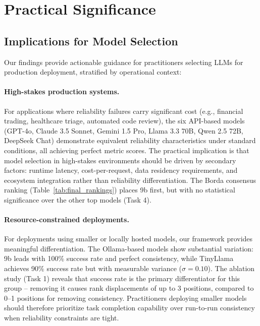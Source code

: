 \section{Practical Significance}

\subsection{Implications for Model Selection}

Our findings provide actionable guidance for practitioners selecting LLMs for production deployment, stratified by operational context:

\paragraph{High-stakes production systems.} For applications where reliability failures carry significant cost (e.g., financial trading, healthcare triage, automated code review), the six API-based models (GPT-4o, Claude 3.5 Sonnet, Gemini 1.5 Pro, Llama 3.3 70B, Qwen 2.5 72B, DeepSeek Chat) demonstrate equivalent reliability characteristics under standard conditions, all achieving perfect metric scores. The practical implication is that model selection in high-stakes environments should be driven by secondary factors: runtime latency, cost-per-request, data residency requirements, and ecosystem integration rather than reliability differentiation. The Borda consensus ranking (Table~\ref{tab:final_rankings}) places 9b first, but with no statistical significance over the other top models (Task 4).

\paragraph{Resource-constrained deployments.} For deployments using smaller or locally hosted models, our framework provides meaningful differentiation. The Ollama-based models show substantial variation: 9b leads with 100\% success rate and perfect consistency, while TinyLlama achieves 90\% success rate but with measurable variance ($\sigma = 0.10$). The ablation study (Task 1) reveals that success rate is the primary differentiator for this group -- removing it causes rank displacements of up to 3 positions, compared to 0--1 positions for removing consistency. Practitioners deploying smaller models should therefore prioritize task completion capability over run-to-run consistency when reliability constraints are tight.

